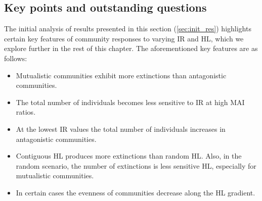
\subsection{Key points and outstanding questions}
\label{sec:questions}


The initial analysis of results presented in this section (\ref{sec:init_res}) highlights certain key features of community responses to varying IR and HL, which we explore further in the rest of this chapter. The aforementioned key features are as follows:

\begin{itemize}
	\item Mutualistic communities exhibit more extinctions than antagonistic communities.
	\item The total number of individuals becomes less sensitive to IR at high MAI ratios.
	\item At the lowest IR values the total number of individuals increases in antagonistic communities.
	\item Contiguous HL produces more extinctions than random HL. Also, in the random scenario, the number of extinctions is less sensitive HL, especially for mutualistic communities.
	\item In certain cases the evenness of communities decrease along the HL gradient.
\end{itemize}

